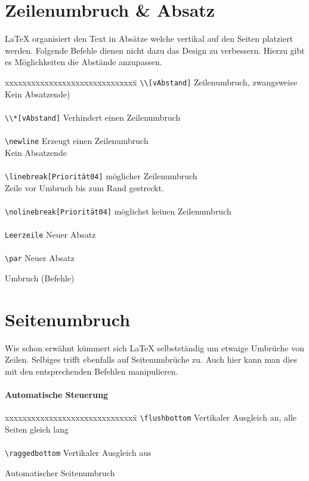 \section{Zeilenumbruch \& Absatz}
\LaTeX{} organisiert den Text in Absätze welche vertikal auf den Seiten platziert werden. Folgende Befehle dienen nicht dazu das Design zu verbessern. Hierzu gibt es Möglichkeiten die Abstände anzupassen.
\begin{table}[H]
\begin{tabbing}
xxxxxxxxxxxxxxxxxxxxxxxxxxxxxx\=\kill
\verb=\\[vAbstand]=					\>Zeilenumbruch, zwangsweise\\
								\>Kein Absatzende)\\
\\
\verb=\\*[vAbstand]=					\>Verhindert einen Zeilenumbruch\\

\\
\verb=\newline=						\>Erzeugt einen Zeilenumbruch\\
								\>Kein Absatzende\\
\\
\verb=\linebreak[Priorität04]=			\>möglicher Zeilenumbruch\\
								\>Zeile vor Umbruch bis zum Rand gestreckt.\\
\\
\verb=\nolinebreak[Priorität04]=			\>möglichst keinen Zeilenumbruch\\
\\
\verb=Leerzeile=						\>Neuer Absatz\\
\\
\verb=\par=						\>Neuer Absatz\\
\end{tabbing}
\caption{Umbruch (Befehle)}
\end{table}


\section{Seitenumbruch}
Wie schon erwähnt kümmert sich \LaTeX{} selbstständig um etwaige Umbrüche von Zeilen. Selbiges trifft ebenfalls auf Seitenumbrüche zu. Auch hier kann man dies mit den entsprechenden Befehlen manipulieren.

\paragraph{Automatische Steuerung}\leavevmode
\begin{table}[H]
\begin{tabbing}
xxxxxxxxxxxxxxxxxxxxxxxxxxxxxx\=\kill
\verb=\flushbottom=					\>Vertikaler Ausgleich an, alle Seiten gleich lang\\
\\
\verb=\raggedbottom=				\>Vertikaler Ausgleich aus\\
\end{tabbing}
\caption{Automatischer Seitenumbruch}
\end{table}
\newpage
